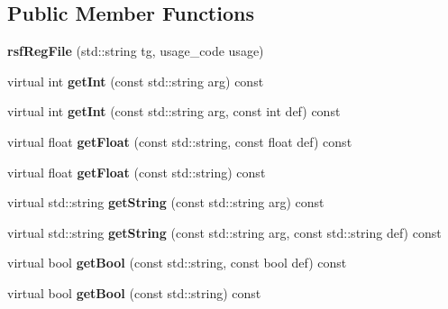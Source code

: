 \subsection*{Public Member Functions}
\begin{DoxyCompactItemize}
\item 
\mbox{\label{classrsf_reg_file_ab774d033d916475071d509454cf76864}} 
{\bfseries rsf\+Reg\+File} (std\+::string tg, usage\+\_\+code usage)
\item 
\mbox{\label{classrsf_reg_file_a6a93845826e2b77df523d2f9cb9131a8}} 
virtual int {\bfseries get\+Int} (const std\+::string arg) const
\item 
\mbox{\label{classrsf_reg_file_a8629a2bf664420f36ecd25a6934ff033}} 
virtual int {\bfseries get\+Int} (const std\+::string arg, const int def) const
\item 
\mbox{\label{classrsf_reg_file_aa6608beb30a43607bdb55f70dc6b2eae}} 
virtual float {\bfseries get\+Float} (const std\+::string, const float def) const
\item 
\mbox{\label{classrsf_reg_file_a62ada4a8336548abab8928b65efe0c6b}} 
virtual float {\bfseries get\+Float} (const std\+::string) const
\item 
\mbox{\label{classrsf_reg_file_a66b9c36f23168f354faedebba17955da}} 
virtual std\+::string {\bfseries get\+String} (const std\+::string arg) const
\item 
\mbox{\label{classrsf_reg_file_aa430d30e5f5e14a4a1752a9cc7db4002}} 
virtual std\+::string {\bfseries get\+String} (const std\+::string arg, const std\+::string def) const
\item 
\mbox{\label{classrsf_reg_file_accaea5d1325788b419ec809c26da55b2}} 
virtual bool {\bfseries get\+Bool} (const std\+::string, const bool def) const
\item 
\mbox{\label{classrsf_reg_file_ad3a352077e23f0003cdf1d3553aab419}} 
virtual bool {\bfseries get\+Bool} (const std\+::string) const
\item 

\end{DoxyCompactItemize}
